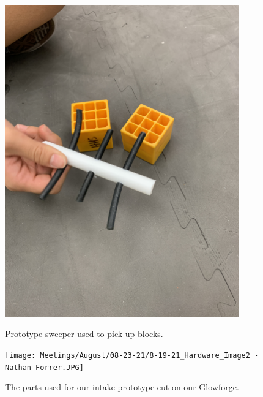 \begin{figure}[ht]
\centering
\begin{minipage}[b]{.48\textwidth}
  \centering
  \includegraphics[width=0.9\textwidth, angle=0]{Meetings/August/08-23-21/8-19-21_Hardware_Image1 - Nathan Forrer.JPG}
  \caption{Prototype sweeper used to pick up blocks.}
  \label{fig:pic1}
\end{minipage}%
\hfill%
\begin{minipage}[b]{.48\textwidth}
  \centering
  \texttt{[image: Meetings/August/08-23-21/8-19-21\_Hardware\_Image2 - Nathan Forrer.JPG]}
  \caption{The parts used for our intake prototype cut on our Glowforge.}
  \label{fig:pic2}
\end{minipage}
\end{figure}


